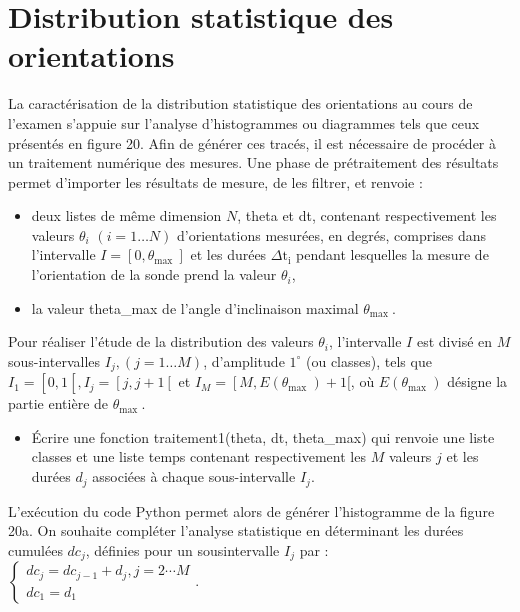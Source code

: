 \section*{Distribution statistique des orientations}
La caractérisation de la distribution statistique des orientations au cours de l'examen s'appuie sur l'analyse d'histogrammes ou diagrammes tels que ceux présentés en figure 20. Afin de générer ces tracés, il est nécessaire de procéder à un traitement numérique des mesures. Une phase de prétraitement des résultats permet d'importer les résultats de mesure, de les filtrer, et renvoie :

\begin{itemize}
  \item[-] deux listes de même dimension $N$, theta et dt, contenant respectivement les valeurs $\theta_{i}$ $(i=1 \ldots N)$ d'orientations mesurées, en degrés, comprises dans l'intervalle $I=\left[0, \theta_{\text {max }}\right]$ et les durées $\Delta \mathrm{t}_{\mathrm{i}}$ pendant lesquelles la mesure de l'orientation de la sonde prend la valeur $\theta_{i}$,
  \item[-] la valeur theta\_max de l'angle d'inclinaison maximal $\theta_{\text {max }}$.
\end{itemize}

Pour réaliser l'étude de la distribution des valeurs $\theta_{i}$, l'intervalle $I$ est divisé en $M$ sous-intervalles $I_{j},(j=1 \ldots M)$, d'amplitude $1^{\circ}$ (ou classes), tels que $I_{1}=\left[0,1\left[, I_{j}=\left[j, j+1\left[\right.\right.\right.\right.$ et $I_{M}=\left[M, E\left(\theta_{\text {max }}\right)+1[\right.$, où $E\left(\theta_{\text {max }}\right)$ désigne la partie entière de $\theta_{\text {max }}$.

\begin{itemize}
  \item[Q34.] Écrire une fonction traitement1(theta, dt, theta\_max) qui renvoie une liste classes et une liste temps contenant respectivement les $M$ valeurs $j$ et les durées $d_{j}$ associées à chaque sous-intervalle $I_{j}$.
\end{itemize}

L'exécution du code Python permet alors de générer l'histogramme de la figure 20a. On souhaite compléter l'analyse statistique en déterminant les durées cumulées $d c_{j}$, définies pour un sousintervalle $I_{j}$ par : $\left\{\begin{array}{c}d c_{j}=d c_{j-1}+d_{j}, j=2 \cdots M \\ d c_{1}=d_{1}\end{array}\right.$.


